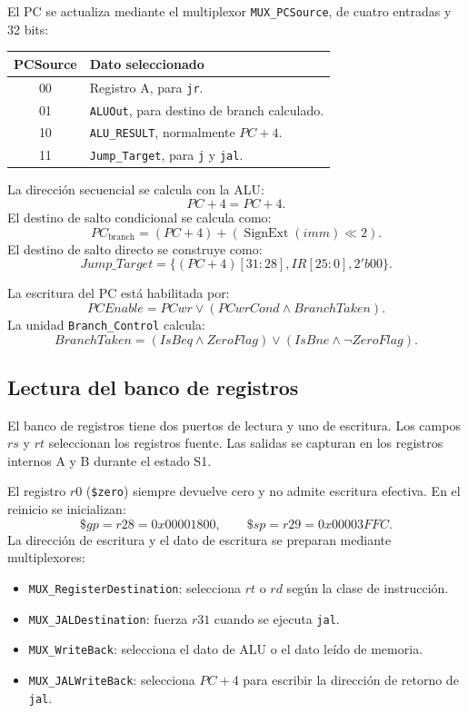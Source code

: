 \documentclass[11pt,a4paper]{article}
\begin{document}
El PC se actualiza mediante el multiplexor \texttt{MUX\_PCSource}, de cuatro entradas y 32 bits:
\begin{center}
\begin{tabularx}{0.9\textwidth}{cX}
\toprule
\textbf{PCSource} & \textbf{Dato seleccionado} \\
\midrule
00 & Registro A, para \texttt{jr}. \\
01 & \texttt{ALUOut}, para destino de branch calculado. \\
10 & \texttt{ALU\_RESULT}, normalmente $PC+4$. \\
11 & \texttt{Jump\_Target}, para \texttt{j} y \texttt{jal}. \\
\bottomrule
\end{tabularx}
\end{center}

La dirección secuencial se calcula con la ALU:
\[
  PC+4 = PC + 4.
\]
El destino de salto condicional se calcula como:
\[
  PC_{\text{branch}} = (PC+4) + (\operatorname{SignExt}(imm)\ll 2).
\]
El destino de salto directo se construye como:
\[
  Jump\_Target = \{(PC+4)[31:28], IR[25:0], 2'b00\}.
\]

La escritura del PC está habilitada por:
\[
  PCEnable = PCwr \lor (PCwrCond \land BranchTaken).
\]
La unidad \texttt{Branch\_Control} calcula:
\[
 BranchTaken=(IsBeq\land ZeroFlag)\lor(IsBne\land\neg ZeroFlag).
\]

\subsection{Lectura del banco de registros}

El banco de registros tiene dos puertos de lectura y uno de escritura. Los campos $rs$ y $rt$ seleccionan los registros fuente. Las salidas se capturan en los registros internos A y B durante el estado S1.

El registro $r0$ (\texttt{\$zero}) siempre devuelve cero y no admite escritura efectiva. En el reinicio se inicializan:
\[
  \$gp=r28=0x00001800,\qquad \$sp=r29=0x00003FFC.
\]
La dirección de escritura y el dato de escritura se preparan mediante multiplexores:
\begin{itemize}
  \item \texttt{MUX\_RegisterDestination}: selecciona $rt$ o $rd$ según la clase de instrucción.
  \item \texttt{MUX\_JALDestination}: fuerza $r31$ cuando se ejecuta \texttt{jal}.
  \item \texttt{MUX\_WriteBack}: selecciona el dato de ALU o el dato leído de memoria.
  \item \texttt{MUX\_JALWriteBack}: selecciona $PC+4$ para escribir la dirección de retorno de \texttt{jal}.
\end{itemize}
\end{document}
